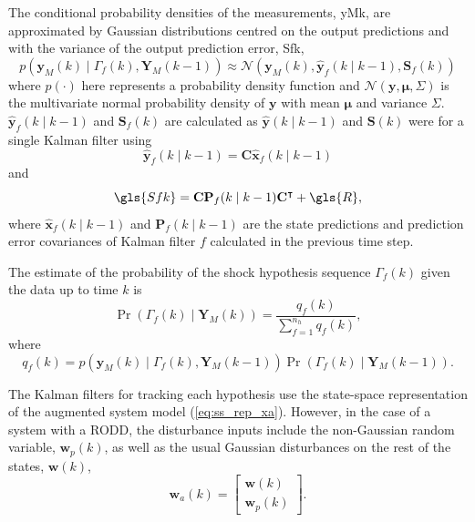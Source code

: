 The conditional probability densities of the measurements, \gls{yMk}, are approximated by Gaussian distributions centred on the output predictions and with the variance of the output prediction error, \gls{Sfk},
\begin{equation} \label{eq:p_yk_given_Gammak_Ykm1}
	p(\mathbf{y}_M(k) \mid \Gamma_f(k), \mathbf{Y}_M(k-1)) \approx \mathcal{N}\left(\mathbf{y}_M(k), \mathbf{\hat{y}}_{f}(k \mid k-1),	\mathbf{S}_f(k) \right)
\end{equation}
%
where $p(\cdot)$ here represents a probability density function and $\mathcal{N}(\mathbf{y}, \mathbf{\mu}, \Sigma)$ is the multivariate normal probability density of $\mathbf{y}$ with mean $\mathbf{\mu}$ and variance $\Sigma$. $\mathbf{\hat{y}}_{f}(k \mid k-1)$ and $\mathbf{S}_f(k)$ are calculated as $\mathbf{\hat{y}}(k \mid k-1)$ and $\mathbf{S}(k)$ were for a single Kalman filter using 
\begin{equation} \label{eq:yfk_pred}
	\mathbf{\hat{y}}_{f}(k \mid k-1) = \mathbf{C}\mathbf{\hat{x}}_{f}(k \mid k-1)
\end{equation}
and
\begin{equation} \label{eq:Sfk}
	\gls{Sfk} = \mathbf{C}\mathbf{P}_f(k \mid k-1)\mathbf{C}^\intercal + \gls{R},
\end{equation}
where $\mathbf{\hat{x}}_{f}(k \mid k-1)$ and $\mathbf{P}_f(k \mid k-1)$ are the state predictions and prediction error covariances of Kalman filter $f$ calculated in the previous time step.

The estimate of the probability of the shock hypothesis sequence $\Gamma_f(k)$ given the data up to time $k$ is
\begin{equation} \label{eq:Pr_Gammak_given_Yk}
	\Pr(\Gamma_f(k) \mid \mathbf{Y}_M(k)) = \frac{q_f(k)}{\sum_{f=1}^{n_h} q_f(k)},
\end{equation}
where
\begin{equation} \label{eq:qfk}
	q_f(k) = p(\mathbf{y}_M(k) \mid \Gamma_f(k), \mathbf{Y}_M(k-1)) \Pr(\Gamma_f(k) \mid \mathbf{Y}_M(k-1)).
\end{equation}

The Kalman filters for tracking each hypothesis use the state-space representation of the augmented system model (\ref{eq:ss_rep_xa}). 
However, in the case of a system with a \gls{RODD}, the disturbance inputs include the non-Gaussian random variable, $\mathbf{w}_p(k)$, as well as the usual Gaussian disturbances on the rest of the states, $\mathbf{w}(k)$,
\begin{equation} \label{eq:wak}
	\mathbf{w}_a(k) = \begin{bmatrix}
		\mathbf{w}(k) \\
		\mathbf{w}_p(k)
	\end{bmatrix}.
\end{equation}

